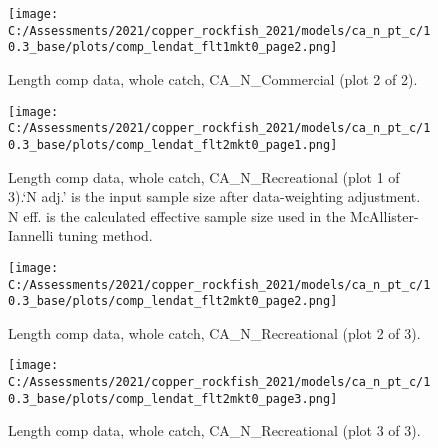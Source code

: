 \documentclass[11pt,
  english,
  a4paper,
]{article}
\begin{document}

\begin{figure}
\centering
\texttt{[image: C:/Assessments/2021/copper\_rockfish\_2021/models/ca\_n\_pt\_c/10.3\_base/plots/comp\_lendat\_flt1mkt0\_page2.png]}
\caption{Length comp data, whole catch, CA\_N\_Commercial (plot 2 of 2).\label{fig:comp_lendat_flt1mkt0_page2}}
\end{figure}

\tagmcend\tagstructend


\begin{figure}
\centering
\texttt{[image: C:/Assessments/2021/copper\_rockfish\_2021/models/ca\_n\_pt\_c/10.3\_base/plots/comp\_lendat\_flt2mkt0\_page1.png]}
\caption{Length comp data, whole catch, CA\_N\_Recreational (plot 1 of 3).`N adj.' is the input sample size after data-weighting adjustment. N eff. is the calculated effective sample size used in the McAllister-Iannelli tuning method.\label{fig:comp_lendat_flt2mkt0_page1}}
\end{figure}

\tagmcend\tagstructend


\begin{figure}
\centering
\texttt{[image: C:/Assessments/2021/copper\_rockfish\_2021/models/ca\_n\_pt\_c/10.3\_base/plots/comp\_lendat\_flt2mkt0\_page2.png]}
\caption{Length comp data, whole catch, CA\_N\_Recreational (plot 2 of 3).\label{fig:comp_lendat_flt2mkt0_page2}}
\end{figure}

\tagmcend\tagstructend


\begin{figure}
\centering
\texttt{[image: C:/Assessments/2021/copper\_rockfish\_2021/models/ca\_n\_pt\_c/10.3\_base/plots/comp\_lendat\_flt2mkt0\_page3.png]}
\caption{Length comp data, whole catch, CA\_N\_Recreational (plot 3 of 3).\label{fig:comp_lendat_flt2mkt0_page3}}
\end{figure}
\end{document}
